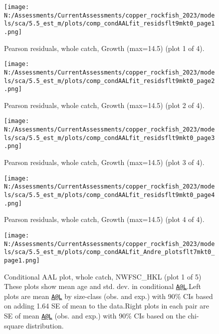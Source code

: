 \documentclass[11pt,
  english,
  letterpaper,
]{article}
\begin{document}
\begin{figure}
\centering
\texttt{[image: N:/Assessments/CurrentAssessments/copper\_rockfish\_2023/models/sca/5.5\_est\_m/plots/comp\_condAALfit\_residsflt9mkt0\_page1.png]}
\caption{Pearson residuals, whole catch, Growth (max=14.5) (plot 1 of 4).\label{fig:comp_condAALfit_residsflt9mkt0_page1}}
\end{figure}

\begin{figure}
\centering
\texttt{[image: N:/Assessments/CurrentAssessments/copper\_rockfish\_2023/models/sca/5.5\_est\_m/plots/comp\_condAALfit\_residsflt9mkt0\_page2.png]}
\caption{Pearson residuals, whole catch, Growth (max=14.5) (plot 2 of 4).\label{fig:comp_condAALfit_residsflt9mkt0_page2}}
\end{figure}

\begin{figure}
\centering
\texttt{[image: N:/Assessments/CurrentAssessments/copper\_rockfish\_2023/models/sca/5.5\_est\_m/plots/comp\_condAALfit\_residsflt9mkt0\_page3.png]}
\caption{Pearson residuals, whole catch, Growth (max=14.5) (plot 3 of 4).\label{fig:comp_condAALfit_residsflt9mkt0_page3}}
\end{figure}

\begin{figure}
\centering
\texttt{[image: N:/Assessments/CurrentAssessments/copper\_rockfish\_2023/models/sca/5.5\_est\_m/plots/comp\_condAALfit\_residsflt9mkt0\_page4.png]}
\caption{Pearson residuals, whole catch, Growth (max=14.5) (plot 4 of 4).\label{fig:comp_condAALfit_residsflt9mkt0_page4}}
\end{figure}

\begin{figure}
\centering
\texttt{[image: N:/Assessments/CurrentAssessments/copper\_rockfish\_2023/models/sca/5.5\_est\_m/plots/comp\_condAALfit\_Andre\_plotsflt7mkt0\_page1.png]}
\caption{Conditional AAL plot, whole catch, NWFSC\_HKL (plot 1 of 5) These plots show mean age and std. dev. in conditional \href{mailto:A@L}{\nolinkurl{A@L}}.Left plots are mean \href{mailto:A@L}{\nolinkurl{A@L}} by size-class (obs. and exp.) with 90\% CIs based on adding 1.64 SE of mean to the data.Right plots in each pair are SE of mean \href{mailto:A@L}{\nolinkurl{A@L}} (obs. and exp.) with 90\% CIs based on the chi-square distribution.\label{fig:comp_condAALfit_Andre_plotsflt7mkt0_page1}}
\end{figure}
\end{document}
